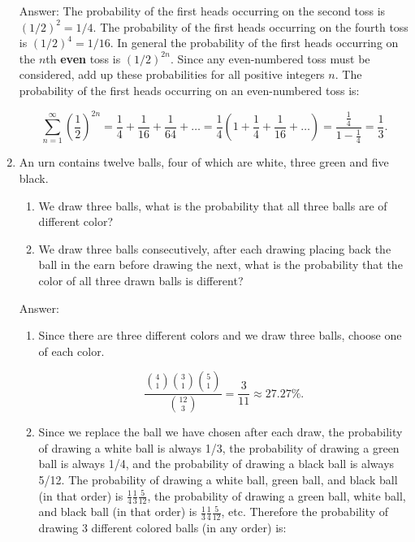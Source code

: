 \documentclass{article}
\begin{document}
\begin{enumerate}
Answer: The probability of the first heads occurring on the second toss is $(1/2)^2 = 1/4$. The probability of the first heads occurring on the fourth toss is $(1/2)^4 =1/16$. In general the probability of the first heads occurring on the $n$th {\bf even} toss is $(1/2)^{2n}$. Since any even-numbered toss must be considered, add up these probabilities for all positive integers $n$. The probability of the first heads occurring on an even-numbered toss is:

$$
\sum_{n=1}^\infty \left(\frac{1}{2}\right)^{2n}
= \frac{1}{4} + \frac{1}{16} + \frac{1}{64} + \dots 
= \frac{1}{4}\left(1 + \frac{1}{4} + \frac{1}{16} + \dots\right)
= \frac{\frac{1}{4}}{1-\frac{1}{4}}
= \frac{1}{3}.
$$

\newpage
\item

An urn contains twelve balls, four of which are white, three green and five black.

\begin{enumerate}
\item We draw three balls, what is the probability that all three balls are of different color?

\item We draw three balls consecutively, after each drawing placing back the ball in the earn before drawing the next, what is the probability that the color of all three drawn balls is different?
\end{enumerate}

Answer:

\begin{enumerate}
\item Since there are three different colors and we draw three balls, choose one of each color.

$$
\frac{\binom{4}{1}\binom{3}{1}\binom{5}{1}}{\binom{12}{3}}
= \frac{3}{11} \approx 27.27\%.
$$

\item Since we replace the ball we have chosen after each draw, the probability of drawing a white ball is always 1/3, the probability of drawing a green ball is always 1/4, and the probability of drawing a black ball is always 5/12. The probability of drawing a white ball, green ball, and black ball (in that order) is $\frac{1}{4}\frac{1}{3}\frac{5}{12}$, the probability of drawing a green ball, white ball, and black ball (in that order) is $\frac{1}{3}\frac{1}{4}\frac{5}{12}$, etc. Therefore the probability of drawing 3 different colored balls (in any order) is:


\end{enumerate}
\end{enumerate}
\end{document}
